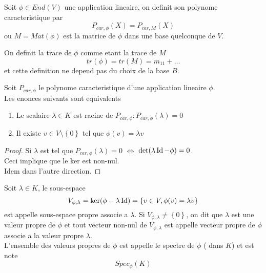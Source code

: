 \documentclass[../main.tex]{subfiles}
\begin{document}
\begin{defn}
	Soit $\phi \in End( V) $ une application lineaire, on definit son polynome caracteristique par
	\[ 
		P_{car, \phi} ( X) = P_{car,M} ( X) 
	\]
	ou $M= Mat( \phi)$ est la matrice de $\phi$ dans une base quelconque de $V$.
\end{defn}
\begin{defn}
On definit la trace de $\phi$ comme etant la trace de $M$ 
\[ 
	tr( \phi) = tr( M) = m_{11} + \ldots
\]
et cette definition ne depend pas du choix de la base $B$.
\end{defn}
\begin{thm}
Soit $P_{car,\phi} $ le polynome caracteristique d'une application lineaire $\phi$.\\
Les enonces suivants sont equivalents
\begin{enumerate}
	\item Le scalaire $\lambda\in K$ est racine de $P_{car, \phi} :P_{car,\phi} ( \lambda) = 0$ 
	\item Il existe $v \in V \setminus \left\{ 0 \right\} $ tel que $\phi( v) = \lambda v$	
\end{enumerate}

\end{thm}
\begin{proof}
	Si $\lambda$ est tel que $P_{car,\phi} ( \lambda) =0$ $\iff$ $\det ( \lambda\operatorname*{Id} - \phi) = 0$.\\
		Ceci implique que le ker est non-nul.\\
		Idem dans l'autre direction.
\end{proof}
\begin{defn}
Soit $\lambda\in K$, le sous-espace 
\[ 
	V_{\phi,\lambda} = \ker( \phi -\lambda\operatorname*{Id}) = \left\{ v \in V, \phi( v) = \lambda v \right\} 
\]
est appelle sous-espace propre associe a $\lambda$. Si $V_{\phi,\lambda} \neq \left\{ 0 \right\} $, on dit que $\lambda$ est une valeur propre de $\phi$ et tout vecteur non-nul de $V_{\phi,\lambda} $ est appelle vecteur propre de $\phi$ associe a la valeur propre $\lambda$.\\
L'ensemble des valeurs propres de $\phi$ est appelle le spectre de $\phi$ ( dans $K$) et est note
\[ 
	Spec_{\phi} ( K) 
\]

\end{defn}
\end{document}
